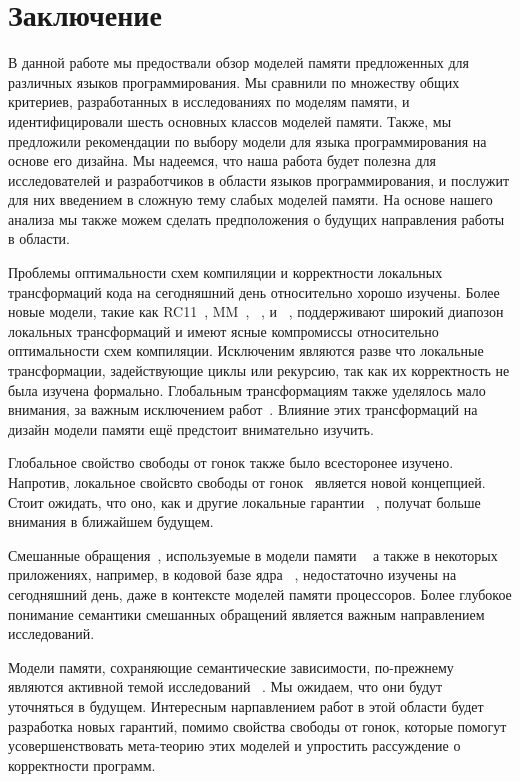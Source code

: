 \section{Заключение}
\label{sec:conclusion}

В данной работе мы предоствали обзор моделей памяти 
предложенных для различных языков программирования. 
Мы сравнили по множеству общих критериев, 
разработанных в исследованиях по моделям памяти, 
и идентифицировали шесть основных классов моделей памяти. 
Также, мы предложили рекомендации по выбору модели 
для языка программирования на основе его дизайна. 
Мы надеемся, что наша работа будет полезна 
для исследователей и разработчиков в области языков программирования, 
и послужит для них введением в сложную тему слабых моделей памяти. 
На основе нашего анализа мы также можем сделать предположения 
о будущих направления работы в области. 

Проблемы оптимальности схем компиляции и корректности локальных трансформаций кода 
на сегодняшний день относительно хорошо изучены.
Более новые модели, такие как 
RC11~\cite{Lahav-al:PLDI17}, \OCaml MM~\cite{Dolan-al:PLDI18},
\Promising~\cite{Kang-al:POPL17,Lee-al:PLDI20},
и \Weakestmo~\cite{Chakraborty-Vafeiadis:POPL19},
поддерживают широкий диапозон локальных трансформаций 
и имеют ясные компромиссы относительно оптимальности схем компиляции. 
Исключеним являются разве что локальные трансформации, 
задействующие циклы или рекурсию, так как их корректность не была изучена формально. 
Глобальным трансформациям также уделялось мало внимания, 
за важным исключением работ~\cite{PichonPharabod-Sewell:POPL16, Lee-al:PLDI20}.
Влияние этих трансформаций на дизайн модели памяти 
ещё предстоит внимательно изучить.

Глобальное свойство свободы от гонок также было всесторонее изучено. 
Напротив, локальное свойсвто свободы от гонок~\cite{Dolan-al:PLDI18}  
является новой концепцией. 
Стоит ожидать, что оно, как и другие локальные гарантии~%
\cite{Dodds-al:ESOP18, Jagadeesan-al:OOPSLA2020, Cho-al:PLDI21}, 
получат больше внимания в ближайшем будущем. 

Смешанные обращения~\cite{Flur-al:POPL17}, 
используемые в модели памяти \JS~\cite{Watt-al:PLDI2020} 
а также в некоторых приложениях, например, в кодовой базе 
ядра \Linux~\cite{Flur-al:POPL17},
недостаточно изучены на сегодняшний день, 
даже в контексте моделей памяти процессоров. 
Более глубокое понимание семантики смешанных обращений 
является важным направлением исследований. 

Модели памяти, сохраняющие семантические зависимости, 
по-прежнему являются активной темой исследований~%
\cite{Kang-al:POPL17, Lee-al:PLDI20, Cho-al:PLDI21,
Chakraborty-Vafeiadis:POPL19, Paviotti-al:ESOP20, 
Jagadeesan-al:OOPSLA2020}.
Мы ожидаем, что они будут уточняться в будущем. 
Интересным нарпавлением работ в этой области 
будет разработка новых гарантий, 
помимо свойства свободы от гонок, 
которые помогут усовершенствовать мета-теорию 
этих моделей и упростить рассуждение о корректности программ. 

